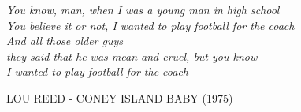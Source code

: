 \documentclass[electronic, oldfontcommands]{kthesis}
\newlength\longest %
\begin{document}
\clearpage

\thispagestyle{empty}
\null\vfill %

\settowidth{}
\begin{center}

\parbox{\longest}{%
	\raggedright{\Large\itshape%
		You know, man, when I was a young man in high school\\ 
		You believe it or not, I wanted to play football for the coach\\
		And all those older guys \\
		they said that he was mean and cruel, but you know \\ 
		I wanted to play football for the coach\par\bigskip
	}   
	\raggedright\MakeUppercase{Lou Reed - Coney Island Baby (1975)}\par%
}
\end{center}

\vfill\vfill

\clearpage

\thispagestyle{empty}
\null\vfill 
\clearpage

\frontmatter %


\newpage










	
\end{document}
